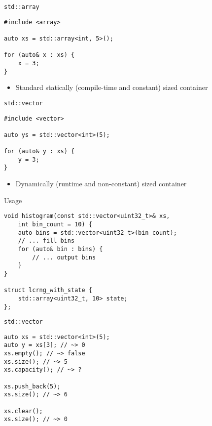 \documentclass[10pt]{beamer}
\begin{document}
\begin{frame}[fragile,label={sec:orga6ddc66}]{\texttt{std::array}}
 \begin{verbatim}
#include <array>

auto xs = std::array<int, 5>();

for (auto& x : xs) {
    x = 3;
}
\end{verbatim}
\begin{itemize}
\item Standard statically (compile-time and constant) sized container
\end{itemize}
\end{frame}

\begin{frame}[fragile,label={sec:orge0f4dcf}]{\texttt{std::vector}}
 \begin{verbatim}
#include <vector>

auto ys = std::vector<int>(5);

for (auto& y : xs) {
    y = 3;
}
\end{verbatim}

\begin{itemize}
\item Dynamically (runtime and non-constant) sized container
\end{itemize}
\end{frame}

\begin{frame}[fragile,label={sec:orgcc0e8c4}]{Usage}
 \begin{verbatim}
void histogram(const std::vector<uint32_t>& xs,
    int bin_count = 10) {
    auto bins = std::vector<uint32_t>(bin_count);
    // ... fill bins
    for (auto& bin : bins) {
        // ... output bins
    }
}

struct lcrng_with_state {
    std::array<uint32_t, 10> state;
};
\end{verbatim}
\end{frame}

\begin{frame}[fragile,label={sec:orgda2b571}]{\texttt{std::vector}}
 \begin{verbatim}
auto xs = std::vector<int>(5);
auto y = xs[3]; // ~> 0
xs.empty(); // ~> false
xs.size(); // ~> 5
xs.capacity(); // ~> ?

xs.push_back(5);
xs.size(); // ~> 6

xs.clear();
xs.size(); // ~> 0
\end{verbatim}
\end{frame}
\end{document}
